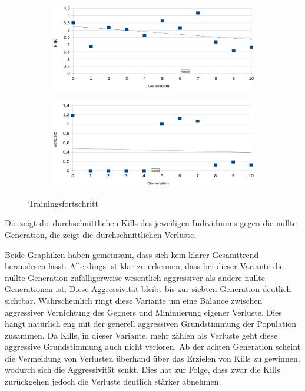\documentclass[
	12pt,
	a4paper,
	BCOR10mm,
	DIV14,
	headsepline,
	usegeometry,
]{scrreprt}
\begin{document}
\begin{figure}
	\begin{subfigure}{\textwidth}
		\centering
		\includegraphics[width=\textwidth]{Durchschnittskills1zu2.png}
		\label{Durchschnittskills1zu2}
	\end{subfigure}
	\begin{subfigure}{\textwidth}
		\centering
		\includegraphics[width=\textwidth]{Durchschnittsverluste1zu2.png}
		\label{Durchschnittsverluste1zu2}
	\end{subfigure}
	\caption{Trainingsfortschritt}
\end{figure}

Die  zeigt die durchschnittlichen Kills des jeweiligen Individuums gegen die nullte Generation, die  zeigt die durchschnittlichen Verluste.

Beide Graphiken haben gemeinsam, dass sich kein klarer Gesamttrend herauslesen lässt.
Allerdings ist klar zu erkennen, dass bei dieser Variante die nullte Generation zufälligerweise wesentlich aggressiver als andere nullte Generationen ist.
Diese Aggressivität bleibt bis zur siebten Generation deutlich sichtbar.
Wahrscheinlich ringt diese Variante um eine Balance zwischen aggressiver Vernichtung des Gegners und Minimierung eigener Verluste.
Dies hängt natürlich eng mit der generell aggressiven Grundstimmung der Population zusammen.
Da Kills, in dieser Variante, mehr zählen als Verluste geht diese aggressive Grundstimmung auch nicht verloren.
Ab der achten Generation scheint die Vermeidung von Verlusten überhand über das Erzielen von Kills zu gewinnen, wodurch sich die Aggressivität senkt.
Dies hat zur Folge, dass zwar die Kills zurückgehen jedoch die Verluste deutlich stärker abnehmen.
\end{document}

